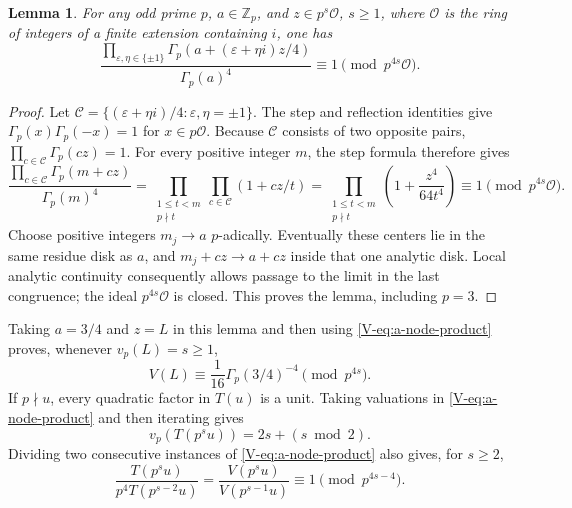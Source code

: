 \documentclass[11pt,letterpaper]{article}
\newtheorem{lemma}[theorem]{Lemma}
\numberwithin{equation}{section}
\begin{document}
\begin{lemma}\label{V-lem:a-four-orbit-gamma}
For any odd prime $p$, $a\in\mathbb Z_p$, and $z\in p^s\mathcal O$,
$s\ge1$, where $\mathcal O$ is the ring of integers of a finite
extension containing $i$, one has
\[
 \frac{\prod_{\varepsilon,\eta\in\{\pm1\}}
 \Gamma_p(a+(\varepsilon+\eta i)z/4)}{\Gamma_p(a)^4}
 \equiv1\pmod{p^{4s}\mathcal O}.
\]
\end{lemma}
\begin{proof}
Let $\mathcal C=\{(\varepsilon+\eta i)/4:\varepsilon,\eta=\pm1\}$.
The step and reflection identities give
$\Gamma_p(x)\Gamma_p(-x)=1$ for $x\in p\mathcal O$.
Because $\mathcal C$ consists of two opposite pairs,
$\prod_{c\in\mathcal C}\Gamma_p(cz)=1$.
For every positive integer $m$, the step formula therefore gives
\[
 \frac{\prod_{c\in\mathcal C}\Gamma_p(m+cz)}{\Gamma_p(m)^4}
 =\prod_{\substack{1\le t<m\\p\nmid t}}
      \prod_{c\in\mathcal C}(1+cz/t)
 =\prod_{\substack{1\le t<m\\p\nmid t}}
      \left(1+\frac{z^4}{64t^4}\right)
 \equiv1\pmod{p^{4s}\mathcal O}.
\]
Choose positive integers $m_j\to a$ $p$-adically. Eventually these
centers lie in the same residue disk as $a$, and $m_j+cz\to a+cz$
inside that one analytic disk. Local analytic continuity consequently
allows passage to the limit in the last congruence; the ideal
$p^{4s}\mathcal O$ is closed. This proves the lemma, including $p=3$.
\end{proof}
Taking $a=3/4$ and $z=L$ in this lemma and then using
\eqref{V-eq:a-node-product} proves, whenever $v_p(L)=s\ge1$,
\[
 V(L)\equiv\frac1{16}\Gamma_p(3/4)^{-4}\pmod{p^{4s}}.
\]
If $p\nmid u$, every quadratic factor in $T(u)$ is a unit. Taking
valuations in \eqref{V-eq:a-node-product} and then iterating gives
\begin{equation}\label{V-eq:a-node-valuation}
 v_p(T(p^su))=2s+(s\bmod2).
\end{equation}
Dividing two consecutive instances of \eqref{V-eq:a-node-product} also
gives, for $s\ge2$,
\begin{equation}\label{V-eq:a-node-two-step}
 \frac{T(p^su)}{p^4T(p^{s-2}u)}
 =\frac{V(p^su)}{V(p^{s-1}u)}
 \equiv1\pmod{p^{4s-4}}.
\end{equation}
\end{document}
